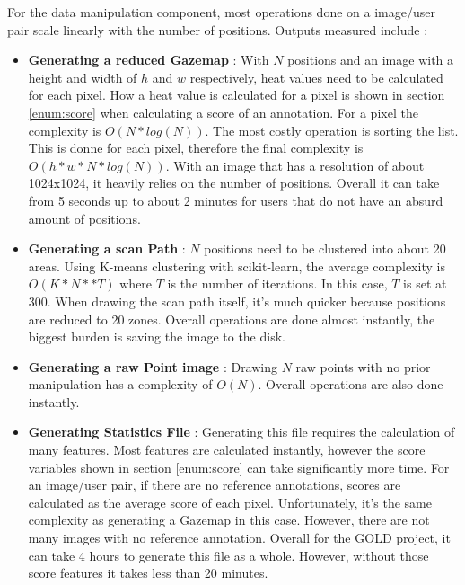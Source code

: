 \documentclass[a4paper,11pt]{report}
\numberwithin{figure}{section} %
\begin{document}
    For the data manipulation component, most operations done on a image/user pair scale linearly with the number of positions.
    Outputs measured include :
    \begin{itemize}
        \item[\textbullet] \textbf{Generating a reduced Gazemap}  : With $N$ positions and an image with a height and width of $h$ and $w$ respectively, heat values need to be calculated for each pixel.
        How a heat value is calculated for a pixel is shown in section \ref{enum:score} when calculating a score of an annotation.
        For a pixel the complexity is $O(N*log(N))$.
        The most costly operation is sorting the list.
        This is donne for each pixel, therefore the final complexity is $O(h*w*N*log(N))$.
        With an image that has a resolution of about 1024x1024, it heavily relies on the number of positions.
        Overall it can take from 5 seconds up to about 2 minutes for users that do not have an absurd amount of positions.
        \item[\textbullet] \textbf{Generating a scan Path} : $N$ positions need to be clustered into about 20 areas.
        Using K-means clustering with scikit-learn, the average complexity is $O(K*N**T)$ where $T$ is the number of iterations.
        In this case, $T$ is set at 300.
        When drawing the scan path itself, it's much quicker because positions are reduced to 20 zones.
        Overall operations are done almost instantly, the biggest burden is saving the image to the disk.
        \item[\textbullet] \textbf{Generating a raw Point image} : Drawing $N$ raw points with no prior manipulation has a complexity of $O(N)$.
        Overall operations are also done instantly.
        \item[\textbullet] \textbf{Generating Statistics File} : Generating this file requires the calculation of many features.
        Most features are calculated instantly, however the score variables shown in section \ref{enum:score} can take significantly more time.
        For an image/user pair, if there are no reference annotations, scores are calculated as the average score of each pixel.
        Unfortunately, it's the same complexity as generating a Gazemap in this case.
        However, there are not many images with no reference annotation.
        Overall for the GOLD project, it can take 4 hours to generate this file as a whole.
        However, without those score features it takes less than 20 minutes.
    \end{itemize}
\end{document}
